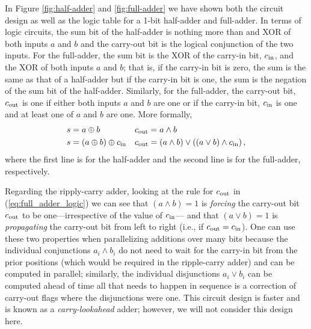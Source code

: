 In Figure \ref{fig:half-adder} and \ref{fig:full-adder} we have shown both the circuit design as well as the logic table for a 1-bit half-adder and full-adder. In terms of logic circuits, the sum bit of the half-adder is nothing more than and XOR of both inputs $a$ and $b$ and the carry-out bit is the logical conjunction of the two inputs. For the full-adder, the sum bit is the XOR of the carry-in bit, $c_{\mathrm{in}}$, and the XOR of both inputs $a$ and $b$; that is, if the carry-in bit is zero, the sum is the same as that of a half-adder but if the carry-in bit is one, the sum is the negation of the sum bit of the half-adder. Similarly, for the full-adder, the carry-out bit, $c_{\mathrm{out}}$ is one if either both inputs $a$ and $b$ are one or if the carry-in bit, $c_{\mathrm{in}}$ is one and at least one of $a$ and $b$ are one. More formally,
\begin{align}
    s & = a \oplus b               & c_{\mathrm{out}} & = a \land b                                                                \\
    s & = (a \oplus b) \oplus c_{\mathrm{in}} & c_{\mathrm{out}} & = (a \land b) \lor ((a \lor b) \land c_{\mathrm{in}}) \label{eq:full_adder_logic} \,,
\end{align}
where the first line is for the half-adder and the second line is for the full-adder, respectively.

Regarding the ripply-carry adder, looking at the rule for $c_{\mathrm{out}}$ in (\ref{eq:full_adder_logic}) we can see that $(a \land b) = 1$ is {\em forcing} the carry-out bit $c_{\mathrm{out}}$ to be one---irrespective of the value of $c_{\mathrm{in}}$--- and that $(a \lor b) = 1$ is {\em propagating} the carry-out bit from left to right (i.e., if $c_{\mathrm{out}} = c_{\mathrm{in}}$). One can use these two properties when parallelizing additions over many bits because the individual conjunctions $a_i \land b_i$ do not need to wait for the carry-in bit from the prior positions (which would be required in the ripple-carry adder) and can be computed in parallel; similarly, the individual disjunctions $a_i \lor b_i$ can be computed ahead of time all that needs to happen in sequence is a correction of carry-out flags where the disjunctions were one. This circuit design is faster and is known as a {\em carry-lookahead} adder; however, we will not consider this design here.

